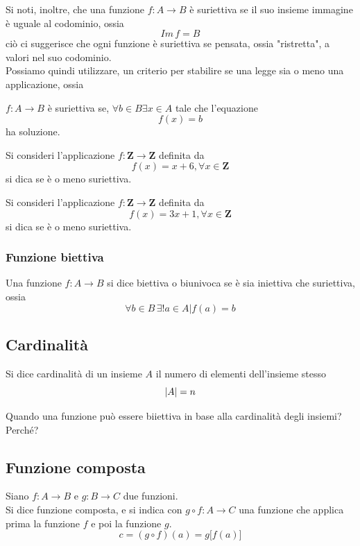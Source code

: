 \begin{flushleft}
Si noti, inoltre, che una funzione $f:A\to B$ è suriettiva se il suo insieme immagine è uguale al codominio, ossia
\[Im\,f = B\]
ciò ci suggerisce che ogni funzione è suriettiva se pensata, ossia "ristretta", a valori nel suo codominio.\\
Possiamo quindi utilizzare, un criterio per stabilire se una legge sia o meno una applicazione, ossia
\begin{criterio}
$f:A\to B$ è suriettiva se, $\forall b\in B \exists x\in A$ tale che l'equazione
\[f(x) = b\]
ha soluzione.
\end{criterio}

\begin{esercizio}
Si consideri l'applicazione $f:\mathbf{Z}\to \mathbf{Z}$ definita da
\[f(x) = x+6, \forall x\in \mathbf{Z}\]
si dica se è o meno suriettiva.
\end{esercizio}
\vspace{150px}

\begin{esercizio}
Si consideri l'applicazione $f:\mathbf{Z}\to \mathbf{Z}$ definita da
\[f(x) = 3x+1, \forall x\in \mathbf{Z}\]
si dica se è o meno suriettiva.
\end{esercizio}
\vspace{150px}


\subsubsection{Funzione biettiva}
Una funzione $f:A\to B$ si dice biettiva o biunivoca se è sia iniettiva che suriettiva, ossia
\[\forall b\in B\,\exists!a\in A|f(a) = b\]

\subsection{Cardinalità}
Si dice cardinalità di un insieme $A$ il numero di elementi dell'insieme stesso
\[\abs{A} = n\]
\begin{esercizio}
Quando una funzione può essere biiettiva in base alla cardinalità degli insiemi? Perché?
\end{esercizio}
\vspace{150px}
\subsection{Funzione composta}
Siano $f:A\to B$ e $g: B\to C$ due funzioni.\\
Si dice funzione composta, e si indica con $g \circ f:A\to C$ una funzione che applica prima la funzione $f$ e poi la funzione $g$.
\[c =(g \circ f)(a) = g\big[f(a)\big]\]


\end{flushleft}
